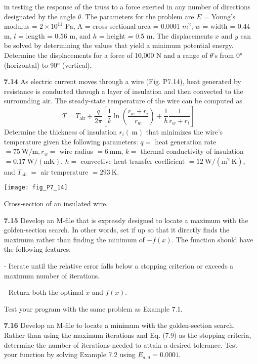 \documentclass[../main.tex]{subfiles}
\begin{document}
\begin{multicols}{2}
	\noindent in testing the response of the truss to a force exerted in any
	number of directions designated by the angle $\theta$. The
	parameters for the problem are $E$ = Young's modulus
	= $2 \times 10^11$ Pa, A = cross-sectional area = 0.0001 $m^2$, $w$ =
	width = 0.44 m, $l$ = length = 0.56 m, and $h$ = height
	= 0.5 m. The displacements $x$ and $y$ can be solved by determining
	the values that yield a minimum potential energy.
	Determine the displacements for a force of 10,000 N and a
	range of $\theta$'s from 0° (horizontal) to 90° (vertical).

	\noindent \textbf{7.14} As electric current moves through a wire (Fig. P7.14), heat generated by resistance is conducted through a layer of insulation and then convected to the surrounding air. The steady-state temperature of the wire can be computed as
	$$
	T=T_{\mathrm{air}}+\frac{q}{2 \pi}\left[\frac{1}{k} \ln \left(\frac{r_{w}+r_{i}}{r_{w}}\right)+\frac{1}{h} \frac{1}{r_{w}+r_{i}}\right]
	$$
	Determine the thickness of insulation $r_{i}(\mathrm{~m})$ that minimizes the wire's temperature given the following parameters: $q=$ heat generation rate $=75 \mathrm{~W} / \mathrm{m}, r_{w}=$ wire radius $=6 \mathrm{~mm}$, $k=$ thermal conductivity of insulation $=0.17 \mathrm{~W} /(\mathrm{m} \mathrm{K})$,
	$h=$ convective heat transfer coefficient $=12 \mathrm{~W} /\left(\mathrm{m}^{2} \mathrm{~K}\right)$, and $T_{\text {air }}=$ air temperature $=293 \mathrm{~K}$.
	
	\begin{center}
	\texttt{[image: fig\_P7\_14]}

	\textsf{Cross-section of an insulated wire.}
	\end{center}

	\newpage
	\noindent \textbf{7.15} Develop an M-file that is expressly designed to locate a maximum with the golden-section search. In other words, set if up so that it directly finds the maximum rather than finding the minimum of $-f(x)$. The function should have the following features:

	- Iterate until the relative error falls below a stopping criterion or exceeds a maximum number of iterations.

	- Return both the optimal $x$ and $f(x)$.

	\noindent Test your program with the same problem as Example 7.1.
	
	\noindent \textbf{7.16} Develop an M-file to locate a minimum with the golden-section search. Rather than using the maximum iterations and Eq. (7.9) as the stopping criteria, determine the number of iterations needed to attain a desired tolerance. Test your function by solving Example $7.2$ using $E_{a, d}=0.0001$. 
	

\end{multicols}
\end{document}
